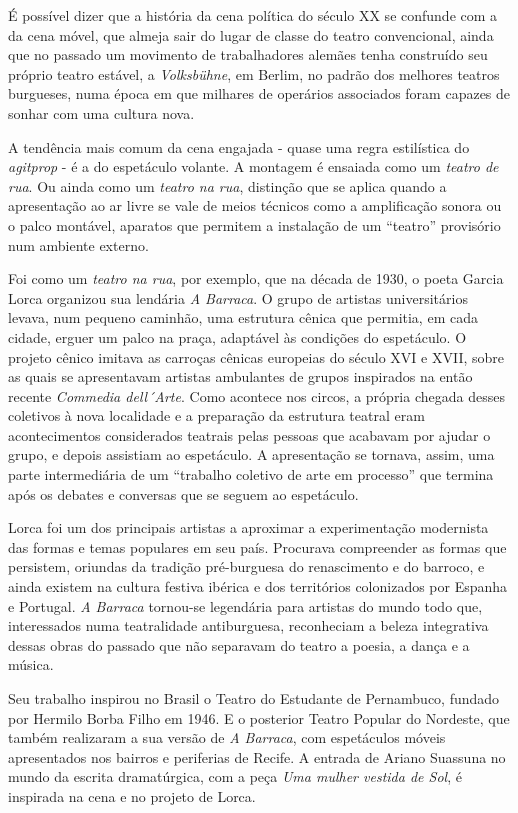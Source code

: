 É possível dizer que a história da cena política do século XX se
confunde com a da cena móvel, que almeja sair do lugar de classe do
teatro convencional, ainda que no passado um movimento de trabalhadores
alemães tenha construído seu próprio teatro estável, a \textit{Volksbühne},
em Berlim, no padrão dos melhores teatros burgueses, numa época em que
milhares de operários associados foram capazes de sonhar com uma cultura
nova.

A tendência mais comum da cena engajada - quase uma regra estilística do
\textit{agitprop} - é a do espetáculo volante. A montagem é ensaiada como
um \textit{teatro de rua}. Ou ainda como um \textit{teatro na rua}, distinção
que se aplica quando a apresentação ao ar livre se vale de meios
técnicos como a amplificação sonora ou o palco montável, aparatos que
permitem a instalação de um “teatro” provisório num ambiente externo.

Foi como um \textit{teatro na rua}, por exemplo, que na década de 1930, o
poeta Garcia Lorca organizou sua lendária \textit{A Barraca}. O grupo de
artistas universitários levava, num pequeno caminhão, uma estrutura
cênica que permitia, em cada cidade, erguer um palco na praça, adaptável
às condições do espetáculo. O projeto cênico imitava as carroças cênicas
europeias do século XVI e XVII, sobre as quais se apresentavam artistas
ambulantes de grupos inspirados na então recente \textit{Commedia
dell´Arte}. Como acontece nos circos, a própria chegada desses coletivos
à nova localidade e a preparação da estrutura teatral eram
acontecimentos considerados teatrais pelas pessoas que acabavam por
ajudar o grupo, e depois assistiam ao espetáculo. A apresentação se
tornava, assim, uma parte intermediária de um “trabalho coletivo de arte
em processo” que termina após os debates e conversas que se seguem ao
espetáculo.

Lorca foi um dos principais artistas a aproximar a experimentação
modernista das formas e temas populares em seu país. Procurava
compreender as formas que persistem, oriundas da tradição pré-burguesa
do renascimento e do barroco, e ainda existem na cultura festiva ibérica
e dos territórios colonizados por Espanha e Portugal. \textit{A Barraca}
tornou-se legendária para artistas do mundo todo que, interessados numa
teatralidade antiburguesa, reconheciam a beleza integrativa dessas obras
do passado que não separavam do teatro a poesia, a dança e a música.

Seu trabalho inspirou no Brasil o Teatro do Estudante de Pernambuco,
fundado por Hermilo Borba Filho em 1946. E o posterior Teatro Popular do
Nordeste, que também realizaram a sua versão de \textit{A Barraca}, com
espetáculos móveis apresentados nos bairros e periferias de Recife. A
entrada de Ariano Suassuna no mundo da escrita dramatúrgica, com a peça
\textit{Uma mulher vestida de Sol}, é inspirada na cena e no projeto de
Lorca.

